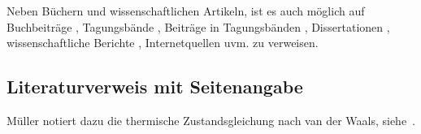 Neben Büchern und wissenschaftlichen Artikeln, ist es auch möglich auf Buchbeiträge \cite{lojewski_urban1989}, Tagungsbände \cite{spliethoff2010a}, Beiträge in Tagungsbänden \cite{fraas1974,fraas1975}, Dissertationen \cite{ruegg1945,gaggioli1961}, wissenschaftliche Berichte \cite{gutstein1975,nas_3_10606_1968}, Internetquellen \cite{dwsim2018,goodwin2017,koenig2024,Kulmbacher2023} uvm. zu verweisen.

\subsection{Literaturverweis mit Seitenangabe}

Müller notiert dazu die thermische Zustandsgleichung nach van der Waals, siehe~\cite[S.~100]{mueller2001}.










